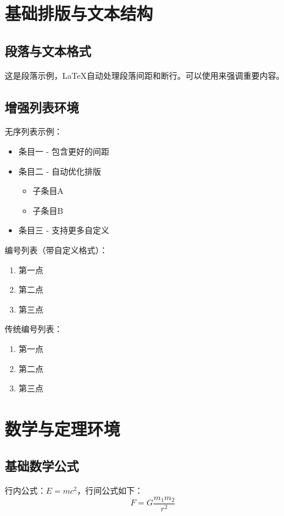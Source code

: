 \documentclass[../main]{subfiles}
\begin{document}
\section{基础排版与文本结构}

\subsection{段落与文本格式}
这是段落示例，LaTeX自动处理段落间距和断行。可以使用来强调重要内容。


\subsection{增强列表环境}
无序列表示例：
\begin{itemize}
    \item 条目一 - 包含更好的间距
    \item 条目二 - 自动优化排版
        \begin{itemize}
            \item 子条目A
            \item 子条目B
        \end{itemize}
    \item 条目三 - 支持更多自定义
\end{itemize}

编号列表（带自定义格式）：
\begin{enumerate}[label=(\arabic*)]
    \item 第一点
    \item 第二点
    \item 第三点
\end{enumerate}

传统编号列表：
\begin{enumerate}
    \item 第一点
    \item 第二点
    \item 第三点
\end{enumerate}

\section{数学与定理环境}

\subsection{基础数学公式}
行内公式：$E=mc^2$，行间公式如下：
\begin{equation}\label{eq:gravity}
    F = G\frac{m_1 m_2}{r^2}
\end{equation}
\end{document}
